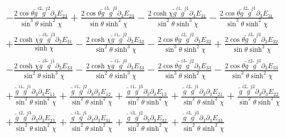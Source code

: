 \documentclass[10pt,letterpaper]{article}
\numberwithin{equation}{section}
\begin{document}
\begin{appendices}
\begin{eqnarray}
&& -  \frac{2 \cos\theta \tilde{g}^{i2} \tilde{g}^{j2} \partial_{3}E_{23}}{\sin^3\theta \sinh^2\chi} + \frac{2 \cos\theta \tilde{g}^{i3} \tilde{g}^{j3} \partial_{3}E_{23}}{\sin\theta \sinh^2\chi} -  \frac{2 \cosh\chi \tilde{g}^{i1} \tilde{g}^{j1} \partial_{3}E_{31}}{\sin^2\theta \sinh^3\chi} -  \frac{2 \cos\theta \tilde{g}^{i2} \tilde{g}^{j1} \partial_{3}E_{31}}{\sin^3\theta \sinh^2\chi} \nonumber \\ 
&& + \frac{2 \cosh\chi \tilde{g}^{i3} \tilde{g}^{j3} \partial_{3}E_{31}}{\sinh\chi} -  \frac{2 \cosh\chi \tilde{g}^{i1} \tilde{g}^{j2} \partial_{3}E_{32}}{\sin^2\theta \sinh^3\chi} -  \frac{2 \cos\theta \tilde{g}^{i2} \tilde{g}^{j2} \partial_{3}E_{32}}{\sin^3\theta \sinh^2\chi} + \frac{2 \cos\theta \tilde{g}^{i3} \tilde{g}^{j3} \partial_{3}E_{32}}{\sin\theta \sinh^2\chi} \nonumber \\ 
&& -  \frac{2 \cosh\chi \tilde{g}^{i3} \tilde{g}^{j1} \partial_{3}E_{33}}{\sin^2\theta \sinh^3\chi} -  \frac{2 \cosh\chi \tilde{g}^{i1} \tilde{g}^{j3} \partial_{3}E_{33}}{\sin^2\theta \sinh^3\chi} -  \frac{2 \cos\theta \tilde{g}^{i3} \tilde{g}^{j2} \partial_{3}E_{33}}{\sin^3\theta \sinh^2\chi} -  \frac{2 \cos\theta \tilde{g}^{i2} \tilde{g}^{j3} \partial_{3}E_{33}}{\sin^3\theta \sinh^2\chi} \nonumber \\ 
&& + \frac{\tilde{g}^{i1} \tilde{g}^{j1} \partial_{3}\partial_{3}E_{11}}{\sin^2\theta \sinh^2\chi} + \frac{\tilde{g}^{i1} \tilde{g}^{j2} \partial_{3}\partial_{3}E_{12}}{\sin^2\theta \sinh^2\chi} + \frac{\tilde{g}^{i1} \tilde{g}^{j3} \partial_{3}\partial_{3}E_{13}}{\sin^2\theta \sinh^2\chi} + \frac{\tilde{g}^{i2} \tilde{g}^{j1} \partial_{3}\partial_{3}E_{21}}{\sin^2\theta \sinh^2\chi} + \frac{\tilde{g}^{i2} \tilde{g}^{j2} \partial_{3}\partial_{3}E_{22}}{\sin^2\theta \sinh^2\chi} \nonumber \\ 
&& + \frac{\tilde{g}^{i2} \tilde{g}^{j3} \partial_{3}\partial_{3}E_{23}}{\sin^2\theta \sinh^2\chi} + \frac{\tilde{g}^{i3} \tilde{g}^{j1} \partial_{3}\partial_{3}E_{31}}{\sin^2\theta \sinh^2\chi} + \frac{\tilde{g}^{i3} \tilde{g}^{j2} \partial_{3}\partial_{3}E_{32}}{\sin^2\theta \sinh^2\chi} + \frac{\tilde{g}^{i3} \tilde{g}^{j3} \partial_{3}\partial_{3}E_{33}}{\sin^2\theta \sinh^2\chi}
\end{eqnarray}

\end{appendices}
\end{document}
